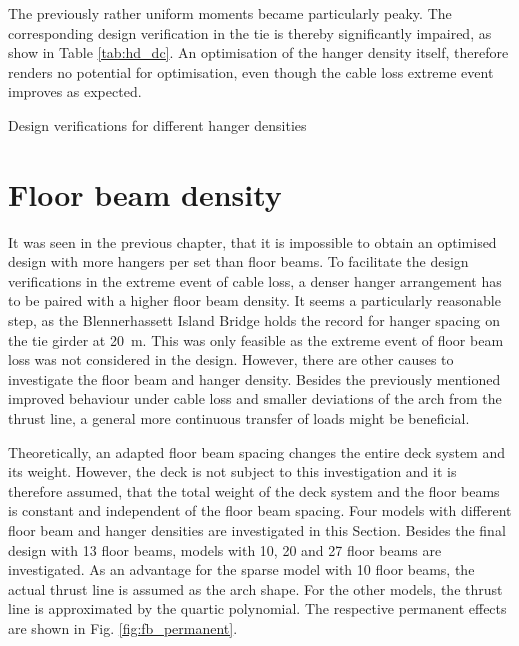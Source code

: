 The previously rather uniform moments became particularly peaky. The corresponding design verification in the tie is thereby significantly impaired, as show in Table \ref{tab:hd_dc}. An optimisation of the hanger density itself, therefore renders no potential for optimisation, even though the cable loss extreme event improves as expected.

\begin{table}[H]
    \centering
    \resizebox{\columnwidth}{!}{%
    
    }
    \caption{Design verifications for different hanger densities}
    \label{tab:hd_dc}
\end{table}


\section{Floor beam density}
It was seen in the previous chapter, that it is impossible to obtain an optimised design with more hangers per set than floor beams. To facilitate the design verifications in the extreme event of cable loss, a denser hanger arrangement has to be paired with a higher floor beam density. It seems a particularly reasonable step, as the Blennerhassett Island Bridge holds the record for hanger spacing on the tie girder at \SI{20}{m}. This was only feasible as the extreme event of floor beam loss was not considered in the design. However, there are other causes to investigate the floor beam and hanger density. Besides the previously mentioned improved behaviour under cable loss and smaller deviations of the arch from the thrust line, a general more continuous transfer of loads might be beneficial. \medskip

Theoretically, an adapted floor beam spacing changes the entire deck system and its weight. However, the deck is not subject to this investigation and it is therefore assumed, that the total weight of the deck system and the floor beams is constant and independent of the floor beam spacing. Four models with different floor beam and hanger densities are investigated in this Section. Besides the final design with 13 floor beams, models with 10, 20 and 27 floor beams are investigated. As an advantage for the sparse model with 10 floor beams, the actual thrust line is assumed as the arch shape. For the other models, the thrust line is approximated by the quartic polynomial. The respective permanent effects are shown in Fig. \ref{fig:fb_permanent}.

